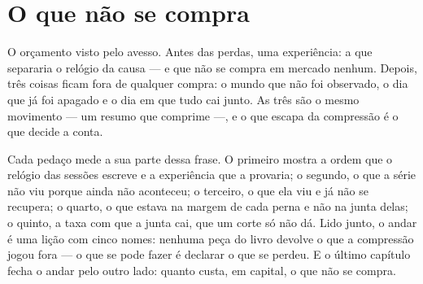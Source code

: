 \documentclass[12pt]{book}
\theoremstyle{definition}
\theoremstyle{remark}
\begin{document}























\part{O que não se compra}

O orçamento visto pelo avesso. Antes das perdas, uma experiência: a que separaria o relógio da
causa --- e que não se compra em mercado nenhum. Depois, três coisas ficam fora de qualquer compra: o
mundo que não foi observado, o dia que já foi apagado e o dia em que tudo cai junto. As três são o mesmo
movimento --- um resumo que comprime ---, e o que escapa da compressão é o que decide a conta.

Cada pedaço mede a sua parte dessa frase. O primeiro mostra a ordem que o relógio das sessões
escreve e a experiência que a provaria; o segundo, o que a série não viu porque ainda não aconteceu; o
terceiro, o que ela viu e já não se recupera; o quarto, o que estava na margem de cada perna e não
na junta delas; o quinto, a taxa com que a junta cai, que um corte só não dá. Lido junto, o andar é uma lição com cinco
nomes: nenhuma peça do livro devolve o que a compressão jogou fora --- o que se pode fazer é declarar o
que se perdeu. E o último capítulo fecha o andar pelo outro lado: quanto custa, em capital, o que não
se compra.
\end{document}
